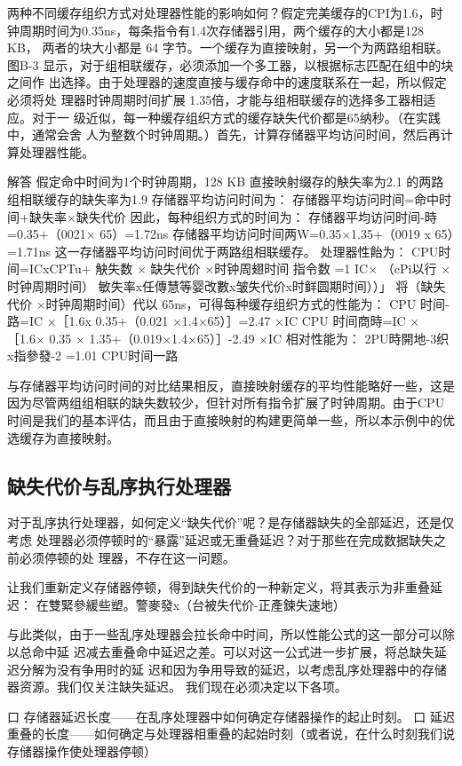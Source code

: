 两种不同缓存组织方式对处理器性能的影响如何？假定完美缓存的CPI为1.6，时
钟周期时间为0.35ns，每条指令有1.4次存储器引用，两个缓存的大小都是128 KB，
两者的块大小都是 64 字节。一个缓存为直接映射，另一个为两路组相联。图B-3
显示，对于组相联缓存，必须添加一个多工器，以根据标志匹配在组中的块之间作
出选择。由于处理器的速度直接与缓存命中的速度联系在一起，所以假定必须将处
理器时钟周期时间扩展 1.35倍，才能与组相联缓存的选择多工器相适应。对于一
级近似，每一种缓存组织方式的缓存缺失代价都是65纳秒。（在实践中，通常会舍
人为整数个时钟周期。）首先，计算存储器平均访问时间，然后再计算处理器性能。

解答
假定命中时间为1个时钟周期，128 KB 直接映射缀存的觖失率为2.1%
的两路组相联缓存的缺失率为1.9%
存储器平均访问时间为：
存储器平均访问时间=命中时间+缺失率×缺失代价
因此，每种组织方式的时间为：
存储器平均访问时间-時=0.35+（0021× 65）=1.72ns
存储器平均访问时间两W=0.35×1.35+（0019 x 65）=1.71ns
这一存储器平均访问时间优于两路组相联缓存。
处理器性飴为：
CPU时间=ICxCPTu+
觖失数 × 缺失代价 ×时钟周翅时间
指令数
=1 IC×
（cPi以行 ×时钟周期时间）
敏失率x任傳慧等婴改數x皱失代价x时鲜圆期时间））」
将（缺失代价 ×时钟周期时间）代以 65ns，可得每种缓存组织方式的性能为：
CPU 时间-路=IC ×［1.6x 0.35+（0.021 ×1.4×65）］=2.47 ×IC
CPU 时间商時=IC × ［1.6× 0.35 × 1.35+（0.019×1.4×65）］-2.49 ×IC
相对性能为：
2PU時開地-3织x指參發-2
=1.01
CPU时间一路

与存储器平均访问时间的对比结果相反，直接映射缓存的平均性能略好一些，这是
因为尽管两组组相联的缺失数较少，但针对所有指令扩展了时钟周期。由于CPU
时间是我们的基本评估，而且由于直接映射的构建更简单一些，所以本示例中的优
选缓存为直接映射。

\subsection{缺失代价与乱序执行处理器}
对于乱序执行处理器，如何定义“缺失代价”呢？是存储器缺失的全部延迟，还是仅考虑
处理器必须停顿时的“暴露”延迟或无重叠延迟？对于那些在完成数据缺失之前必须停顿的处
理器，不存在这一问题。

让我们重新定义存储器停顿，得到缺失代价的一种新定义，将其表示为非重叠延迟：
在雙緊參緩些塑。警麥發x（台被失代价-正產鍊失速地）

与此类似，由于一些乱序处理器会拉长命中时间，所以性能公式的这一部分可以除以总命中延
迟减去重叠命中延迟之差。可以对这一公式进一步扩展，将总缺失延迟分解为没有争用时的延
迟和因为争用导致的延迟，以考虑乱序处理器中的存储器资源。我们仅关注缺失延迟。
我们现在必须决定以下各项。

口 存储器延迟长度——在乱序处理器中如何确定存储器操作的起止时刻。
口 延迟重叠的长度——如何确定与处理器相重叠的起始时刻（或者说，在什么时刻我们说
存储器操作使处理器停顿）

